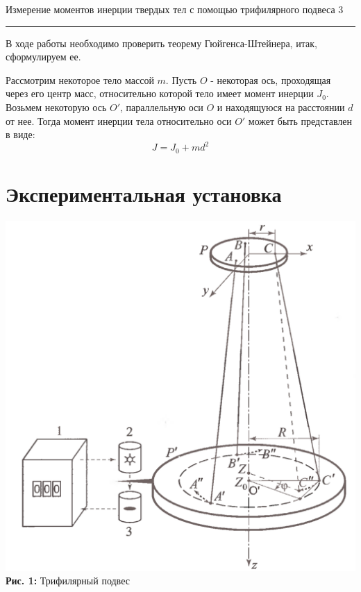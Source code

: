 \documentclass[12pt,a4paper]{scrartcl}
\begin{document}
	\newpage
	
	\begin{flushleft}
		\footnotesize{Измерение моментов инерции твердых тел с помощью трифилярного подвеса} \hspace{\fill} \footnotesize{3}
		\\[-0.3cm]\noindent\rule{\textwidth}{0.3pt}
	\end{flushleft}

	В ходе работы необходимо проверить теорему Гюйгенса-Штейнера, итак, сформулируем ее.
	
	\begin{theorem}
		Рассмотрим некоторое тело массой $m$. Пусть $O$ - некоторая ось, проходящая через его центр масс, относительно которой тело имеет момент инерции $J_0$. Возьмем некоторую ось $O'$, параллельную оси $O$ и находящуюся на расстоянии $d$ от нее. Тогда момент инерции тела относительно оси $O'$ может быть представлен в виде:
		$$J = J_0 + md^2$$
	\end{theorem}				

	\section{Экспериментальная установка}

	\begin{center}
		\includegraphics[scale=0.2]{PIC_1.png}
		\\\textbf{Рис. 1: } Трифилярный подвес
	\end{center}
\end{document}
